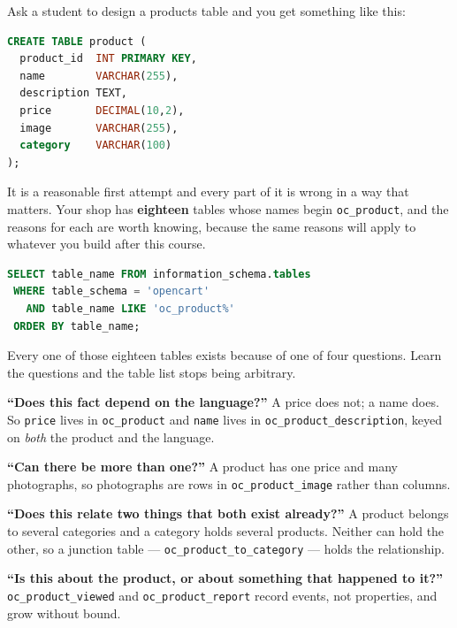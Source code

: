 Ask a student to design a products table and you get something like this:

\begin{lstlisting}[language=sql]
CREATE TABLE product (
  product_id  INT PRIMARY KEY,
  name        VARCHAR(255),
  description TEXT,
  price       DECIMAL(10,2),
  image       VARCHAR(255),
  category    VARCHAR(100)
);
\end{lstlisting}

It is a reasonable first attempt and every part of it is wrong in a way that
matters. Your shop has \textbf{eighteen} tables whose names begin
\texttt{oc\_product}, and the reasons for each are worth knowing, because the
same reasons will apply to whatever you build after this course.

\begin{lstlisting}[language=sql]
SELECT table_name FROM information_schema.tables
 WHERE table_schema = 'opencart'
   AND table_name LIKE 'oc_product%'
 ORDER BY table_name;
\end{lstlisting}

\begin{conceptbox}
Every one of those eighteen tables exists because of one of four questions.
Learn the questions and the table list stops being arbitrary.

\begin{tightnum}
  \item \textbf{``Does this fact depend on the language?''} A price does not;
        a name does. So \texttt{price} lives in \texttt{oc\_product} and
        \texttt{name} lives in \texttt{oc\_product\_description}, keyed on
        \emph{both} the product and the language.
  \item \textbf{``Can there be more than one?''} A product has one price and
        many photographs, so photographs are rows in
        \texttt{oc\_product\_image} rather than columns.
  \item \textbf{``Does this relate two things that both exist already?''} A
        product belongs to several categories and a category holds several
        products. Neither can hold the other, so a junction table ---
        \texttt{oc\_product\_to\_category} --- holds the relationship.
  \item \textbf{``Is this about the product, or about something that happened
        to it?''} \texttt{oc\_product\_viewed} and \texttt{oc\_product\_report}
        record events, not properties, and grow without bound.
\end{tightnum}
\end{conceptbox}

